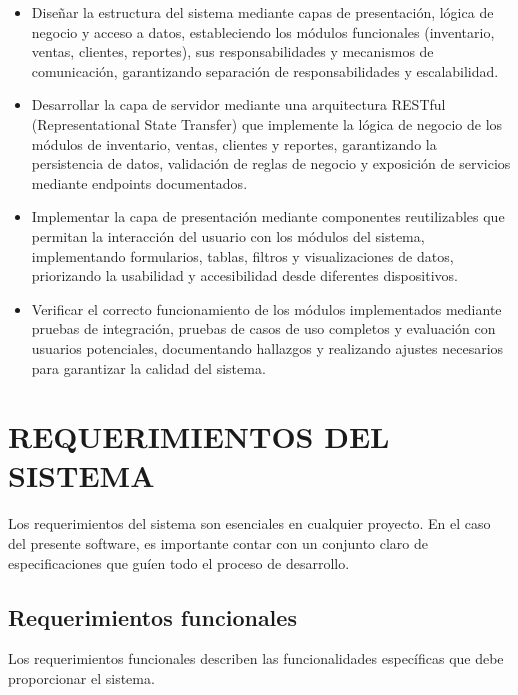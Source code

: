 \documentclass[spanish]{ieee_upb}
\begin{document}
\begin{itemize}
	\item Diseñar la estructura del sistema mediante capas de presentación, lógica de negocio y acceso a datos, estableciendo los módulos funcionales (inventario, ventas, clientes, reportes), sus responsabilidades y mecanismos de comunicación, garantizando separación de responsabilidades y escalabilidad.
	\item Desarrollar la capa de servidor mediante una arquitectura RESTful (Representational State Transfer) que implemente la lógica de negocio de los módulos de inventario, ventas, clientes y reportes, garantizando la persistencia de datos, validación de reglas de negocio y exposición de servicios mediante endpoints documentados.
	\item Implementar la capa de presentación mediante componentes reutilizables que permitan la interacción del usuario con los módulos del sistema, implementando formularios, tablas, filtros y visualizaciones de datos, priorizando la usabilidad y accesibilidad desde diferentes dispositivos.
	\item Verificar el correcto funcionamiento de los módulos implementados mediante pruebas de integración, pruebas de casos de uso completos y evaluación con usuarios potenciales, documentando hallazgos y realizando ajustes necesarios para garantizar la calidad del sistema.
\end{itemize}

\section{REQUERIMIENTOS DEL SISTEMA}

Los requerimientos del sistema son esenciales en cualquier proyecto. En el caso del presente software, es importante contar con un conjunto claro de especificaciones que guíen todo el proceso de desarrollo.

\subsection{Requerimientos funcionales}

Los requerimientos funcionales describen las funcionalidades específicas que debe proporcionar el sistema.


\end{document}
